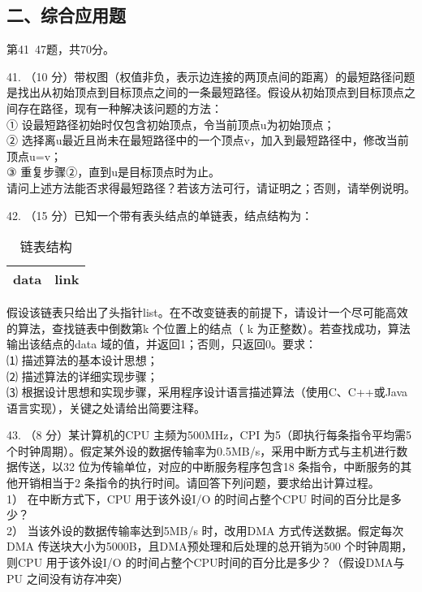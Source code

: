 \subsection{二、综合应用题}
第41~47题，共70分。

41. （10 分）带权图（权值非负，表示边连接的两顶点间的距离）的最短路径问题是找出从初始顶点到目标顶点之间的一条最短路径。假设从初始顶点到目标顶点之间存在路径，现有一种解决该问题的方法： \\
① 设最短路径初始时仅包含初始顶点，令当前顶点u为初始顶点； \\
② 选择离u最近且尚未在最短路径中的一个顶点v，加入到最短路径中，修改当前顶点u=v； \\
③ 重复步骤②，直到u是目标顶点时为止。 \\
请问上述方法能否求得最短路径？若该方法可行，请证明之；否则，请举例说明。

42. （15 分）已知一个带有表头结点的单链表，结点结构为：
\begin{table}[ht]
\centering
\caption{链表结构}\label{tab_CSN09_1}
\begin{tabular}{|c|c|}
\hline
data & link \\
\hline
\end{tabular}
\end{table}
假设该链表只给出了头指针list。在不改变链表的前提下，请设计一个尽可能高效的算法，查找链表中倒数第k 个位置上的结点（ k 为正整数）。若查找成功，算法输出该结点的data 域的值，并返回1；否则，只返回0。要求： \\
⑴ 描述算法的基本设计思想； \\
⑵ 描述算法的详细实现步骤； \\
⑶ 根据设计思想和实现步骤，采用程序设计语言描述算法（使用C、C++或Java 语言实现），关键之处请给出简要注释。

43. （8 分）某计算机的CPU 主频为500MHz，CPI 为5（即执行每条指令平均需5 个时钟周期）。假定某外设的数据传输率为0.5MB/s，采用中断方式与主机进行数据传送，以32 位为传输单位，对应的中断服务程序包含18 条指令，中断服务的其他开销相当于2 条指令的执行时间。请回答下列问题，要求给出计算过程。 \\
1） 在中断方式下，CPU 用于该外设I/O 的时间占整个CPU 时间的百分比是多少？ \\
2） 当该外设的数据传输率达到5MB/s 时，改用DMA 方式传送数据。假定每次DMA 传送块大小为5000B，且DMA预处理和后处理的总开销为500 个时钟周期，则CPU 用于该外设I/O 的时间占整个CPU时间的百分比是多少？（假设DMA与PU 之间没有访存冲突）

